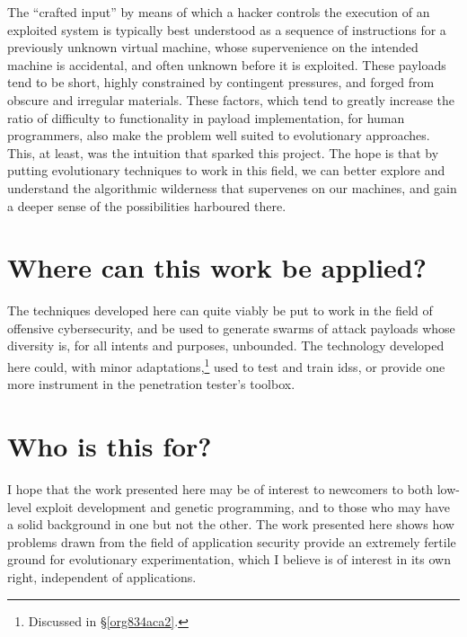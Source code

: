 \documentclass[12pt,glossary]{dalthesis}
\begin{document}
The ``crafted input'' by means of which a hacker controls the execution of
an exploited system is typically best understood as a sequence of instructions
for a previously unknown virtual machine, whose supervenience on the intended
machine is accidental, and often unknown before it is exploited.
These payloads tend to be short, highly constrained by contingent
pressures, and forged from obscure and irregular materials. These factors,
which tend to greatly increase the ratio of difficulty to functionality in
payload implementation, for human programmers, also make the problem
well suited to evolutionary approaches. This, at least, was the intuition
that sparked this project. The hope is that by putting evolutionary techniques
to work in this field, we can better explore and understand the algorithmic
wilderness that supervenes on our machines, and gain a deeper sense of the
possibilities harboured there.

\section{Where can this work be applied?}
\label{sec:orga7169ce}
The techniques developed here can quite viably be put to work in the field of
offensive cybersecurity, and be used to generate swarms of attack payloads whose
diversity is, for all intents and purposes, unbounded. The technology developed
here could, with minor adaptations,\footnote{Discussed in \S \ref{org834aca2}.} used
to test and train \glspl{ids}, or provide one more instrument in the penetration
tester's toolbox.

\section{Who is this for?}
\label{sec:org7df47d7}

I hope that the work presented here may be of interest to newcomers to
both low-level exploit development and genetic programming, and to those
who may have a solid background in one but not the other. The work presented
here shows how problems drawn from the field of application security provide
an extremely fertile ground for evolutionary experimentation, which I believe
is of interest in its own right, independent of applications. 
\end{document}
